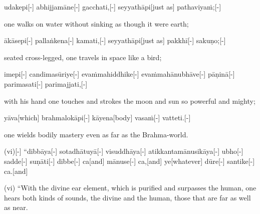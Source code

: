 \begin{samepage}
\begingl[glneveryline={\PaliGlossA,\PaliGlossB}]
udakepi[-] abhijjamāne[-] gacchati,[-] seyyathāpi[just as] pathaviyaṁ;[-]
\endgl
\nopagebreak
\linespread{0.5}
\begin{spacin}{0.2}
{\PaliGlossFT one walks on water without sinking as though it were earth;}
\end{spacin}
\vskip 12pt
\end{samepage}
\begin{samepage}
\begingl[glneveryline={\PaliGlossA,\PaliGlossB}]
ākāsepi[-] pallaṅkena[-] kamati,[-] seyyathāpi[just as] pakkhī[-] sakuṇo;[-]
\endgl
\nopagebreak
\linespread{0.5}
\begin{spacin}{0.2}
{\PaliGlossFT seated cross-legged, one travels in space like a bird;}
\end{spacin}
\vskip 12pt
\end{samepage}
\begin{samepage}
\begingl[glneveryline={\PaliGlossA,\PaliGlossB}]
imepi[-] candimasūriye[-] evaṁmahiddhike[-] evaṁmahānubhāve[-] pāṇinā[-] parimasati[-] parimajjati,[-]
\endgl
\nopagebreak
\linespread{0.5}
\begin{spacin}{0.2}
{\PaliGlossFT with his hand one touches and strokes the moon and sun so powerful and mighty;}
\end{spacin}
\vskip 12pt
\end{samepage}
\begin{samepage}
\begingl[glneveryline={\PaliGlossA,\PaliGlossB}]
yāva[which] brahmalokāpi[-] kāyena[body] vasaṁ[-] vatteti.[-]
\endgl
\nopagebreak
\linespread{0.5}
\begin{spacin}{0.2}
{\PaliGlossFT one wields bodily mastery even as far as the Brahma-world.}
\end{spacin}
\vskip 12pt
\end{samepage}
\begin{samepage}
\begingl[glneveryline={\PaliGlossA,\PaliGlossB}]
(vi)[-] “dibbāya[-] sotadhātuyā[-] visuddhāya[-] atikkantamānusikāya[-] ubho[-] sadde[-] suṇāti[-] dibbe[-] ca[and] mānuse[-] ca,[and] ye[whatever] dūre[-] santike[-] ca.[and]
\endgl
\nopagebreak
\linespread{0.5}
\begin{spacin}{0.2}
{\PaliGlossFT (vi) “With the divine ear element, which is purified and surpasses the human, one hears both kinds of sounds, the divine and the human, those that are far as well as near.}
\end{spacin}
\vskip 12pt
\end{samepage}
